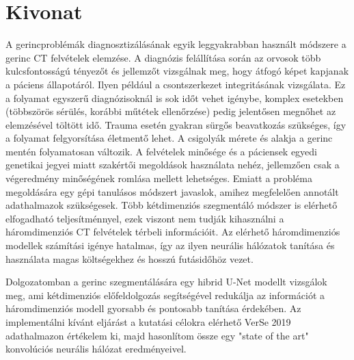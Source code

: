\setcounter{page}{1}

\selecthungarian

\chapter*{Kivonat}

A gerincproblémák diagnosztizálásának egyik leggyakrabban használt módszere a gerinc CT felvételek elemzése. A diagnózis felállítása során az orvosok több kulcsfontosságú tényezőt és jellemzőt vizsgálnak meg, hogy átfogó képet kapjanak a páciens állapotáról. Ilyen például a csontszerkezet integritásának vizsgálata. Ez a folyamat egyszerű diagnózisoknál is sok időt vehet igénybe, komplex esetekben (többszörös sérülés, korábbi műtétek ellenőrzése) pedig jelentősen megnőhet az elemzésével töltött idő. Trauma esetén gyakran sürgős beavatkozás szükséges, így a folyamat felgyorsítása életmentő lehet. 
A csigolyák mérete és alakja a gerinc mentén folyamatosan változik. A felvételek minősége és a páciensek egyedi genetikai jegyei miatt szakértői megoldások használata nehéz, jellemzően csak a végeredmény minőségének romlása mellett lehetséges. Emiatt a probléma megoldására egy gépi tanulásos módszert javaslok, amihez megfelelően annotált adathalmazok szükségesek. 
Több kétdimenziós szegmentáló módszer is elérhető elfogadható teljesítménnyel, ezek viszont nem tudják kihasználni a háromdimenziós CT felvételek térbeli információit. Az elérhető háromdimenziós modellek számítási igénye hatalmas, így az ilyen neurális hálózatok tanítása és használata magas költségekhez és hosszú futásidőhöz vezet.

Dolgozatomban a gerinc szegmentálására egy hibrid U-Net modellt vizsgálok meg, ami kétdimenziós előfeldolgozás segítségével redukálja az információt a háromdimenziós modell gyorsabb és pontosabb tanítása érdekében. Az implementálni kívánt eljárást a kutatási célokra elérhető VerSe 2019 adathalmazon értékelem ki, majd hasonlítom össze egy "state of the art" konvolúciós neurális hálózat eredményeivel.



\vfill
\selectenglish


